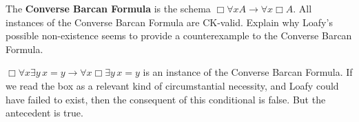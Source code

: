 \begin{exercise}
  The \textbf{Converse Barcan Formula} is the schema
  $\Box \forall x A \to \forall x \Box A$. All instances of the Converse Barcan
  Formula are CK-valid. Explain why Loafy's possible non-existence seems to
  provide a counterexample to the Converse Barcan Formula.
\end{exercise}
\begin{solution}
  $\Box \forall x \exists y\, x\!=\!y \to \forall x \Box\exists y\, x\!=\!y$ is an
  instance of the Converse Barcan Formula. If we read the box as a relevant kind
  of circumstantial necessity, and Loafy could have failed to exist, then the
  consequent of this conditional is false. But the antecedent is true.
\end{solution}


